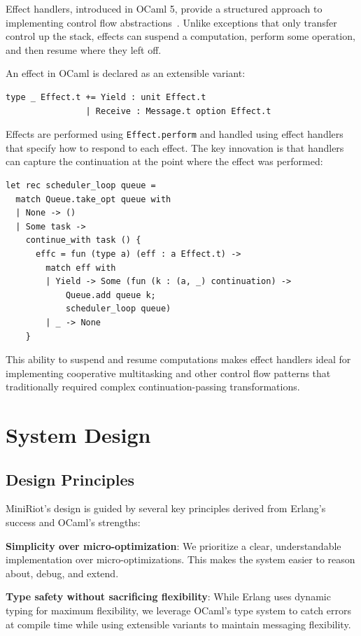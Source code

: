 \documentclass[sigplan,screen]{acmart}
\begin{document}
Effect handlers, introduced in OCaml 5, provide a structured approach to implementing control flow abstractions~\cite{ocaml5effects}. Unlike exceptions that only transfer control up the stack, effects can suspend a computation, perform some operation, and then resume where they left off.

An effect in OCaml is declared as an extensible variant:

\begin{lstlisting}
type _ Effect.t += Yield : unit Effect.t
                | Receive : Message.t option Effect.t
\end{lstlisting}

Effects are performed using \texttt{Effect.perform} and handled using effect handlers that specify how to respond to each effect. The key innovation is that handlers can capture the continuation at the point where the effect was performed:

\begin{lstlisting}
let rec scheduler_loop queue = 
  match Queue.take_opt queue with
  | None -> ()
  | Some task ->
    continue_with task () {
      effc = fun (type a) (eff : a Effect.t) ->
        match eff with
        | Yield -> Some (fun (k : (a, _) continuation) ->
            Queue.add queue k;
            scheduler_loop queue)
        | _ -> None
    }
\end{lstlisting}

This ability to suspend and resume computations makes effect handlers ideal for implementing cooperative multitasking and other control flow patterns that traditionally required complex continuation-passing transformations.

\section{System Design}

\subsection{Design Principles}

MiniRiot's design is guided by several key principles derived from Erlang's success and OCaml's strengths:

\textbf{Simplicity over micro-optimization}: We prioritize a clear, understandable implementation over micro-optimizations. This makes the system easier to reason about, debug, and extend.

\textbf{Type safety without sacrificing flexibility}: While Erlang uses dynamic typing for maximum flexibility, we leverage OCaml's type system to catch errors at compile time while using extensible variants to maintain messaging flexibility.
\end{document}
